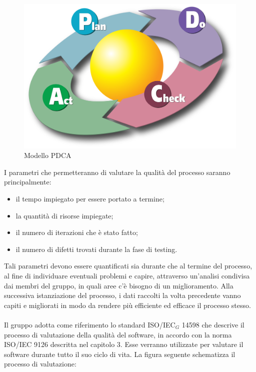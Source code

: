 \begin{figure}[h!]
	\centering
	\includegraphics[scale=.2]{img/2000px-PDCA_Cycle.png}
	\caption{Modello PDCA}
	\label{fig:ModelloPDCA}
\end{figure} 

I parametri che permetteranno di valutare la qualità del processo saranno principalmente:
\begin{itemize}
	\item il tempo impiegato per essere portato a termine; 
	\item la quantità di risorse impiegate;
	\item il numero di iterazioni che è stato fatto;
	\item il numero di difetti trovati durante la fase di testing.
\end{itemize}
Tali parametri devono essere quantificati sia durante che al termine del processo, al fine di individuare eventuali problemi e capire, attraverso un'analisi condivisa dai membri del gruppo, in quali aree c'è bisogno di un miglioramento. Alla successiva istanziazione del processo, i dati raccolti la volta precedente vanno capiti e migliorati in modo da rendere più efficiente ed efficace il processo stesso. \\ \\
Il gruppo \gruppo adotta come riferimento lo standard ISO/IEC$_G$ 14598 che descrive il processo di valutazione della qualità del software, in accordo con la norma ISO/IEC 9126 descritta nel capitolo 3. Esse verranno utilizzate per valutare il software durante tutto il suo ciclo di vita. La figura seguente schematizza il processo di valutazione:


